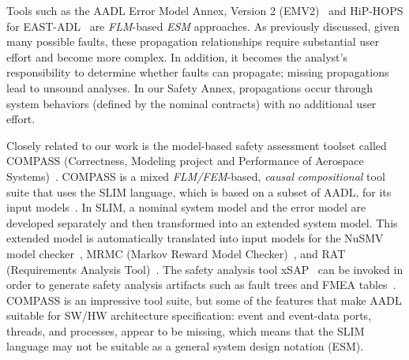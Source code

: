 
Tools such as the AADL Error Model Annex, Version 2 (EMV2)~\cite{EMV2} and HiP-HOPS for EAST-ADL~\cite{CHEN201391} are {\em FLM}-based {\em ESM} approaches.  As previously discussed, given many possible faults, these propagation relationships require substantial user effort and become more complex.  In addition, it becomes the analyst's responsibility to determine whether faults can propagate; missing propagations lead to unsound analyses.  In our Safety Annex, propagations occur through system behaviors (defined by the nominal contracts) with no additional user effort.

Closely related to our work is the model-based safety assessment toolset called COMPASS (Correctness, Modeling project and Performance of Aerospace Systems)~\cite{10.1007/978-3-642-04468-7_15}.  COMPASS is a mixed {\em FLM/FEM}-based, {\em causal} {\em compositional} tool suite that uses the SLIM language, which is based on a subset of AADL, for its input models~\cite{5185388, criticalembeddedsystems}. In SLIM, a nominal system model and the error model are developed separately and then transformed into an extended system model.  This extended model is automatically translated into input models for the NuSMV model checker~\cite{Cimatti2000, NuSMV}, MRMC (Markov Reward Model Checker)~\cite{Katoen:2005:MRM:1114692.1115230, MRMC}, and RAT (Requirements Analysis Tool)~\cite{RAT}. The safety analysis tool xSAP~\cite{DBLP:conf/tacas/BittnerBCCGGMMZ16} can be invoked in order to generate safety analysis artifacts such as fault trees and FMEA tables~\cite{compass30toolset}.  COMPASS is an impressive tool suite, but some of the features that make AADL suitable for SW/HW architecture specification: event and event-data ports, threads, and processes, appear to be missing, which means that the SLIM language may not be suitable as a general system design notation (ESM).



